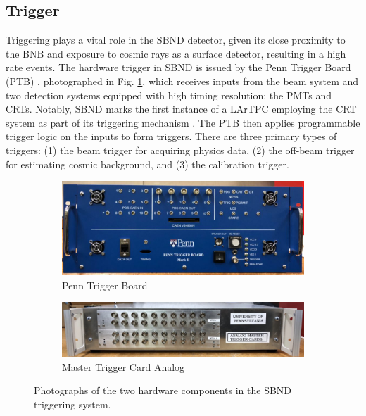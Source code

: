 \subsection{Trigger}

Triggering plays a vital role in the SBND detector, given its close proximity to the BNB and exposure to cosmic rays as a surface detector, resulting in a high rate events. 
The hardware trigger in SBND is issued by the Penn Trigger Board (PTB) \cite{ptb_gvs}, photographed in Fig. \ref{fig:SBND_PTB_MTCA}, which receives inputs from the beam system and two detection systems equipped with high timing resolution: the PMTs and CRTs. 
Notably, SBND marks the first instance of a LArTPC employing the CRT system as part of its triggering mechanism \cite{CPAD2022}.
The PTB then applies programmable trigger logic on the inputs to form triggers.
There are three primary types of triggers: (1) the beam trigger for acquiring physics data, (2) the off-beam trigger for estimating cosmic background, and (3) the calibration trigger.

\begin{figure}[tbp!]
\begin{subfigure}[h]{0.5\linewidth}
\centering    
\includegraphics[width=\linewidth]{SBND_PTB}
\caption{Penn Trigger Board}
\end{subfigure}
\hfill
\begin{subfigure}[h]{0.5\linewidth}
\centering    
\includegraphics[width=\linewidth]{SBND_MTCA}
\caption{Master Trigger Card Analog}
\end{subfigure}%
\caption[SBND_PTB_MTCA]{
Photographs of the two hardware components in the SBND triggering system.
}\label{fig:SBND_PTB_MTCA}
\end{figure}


